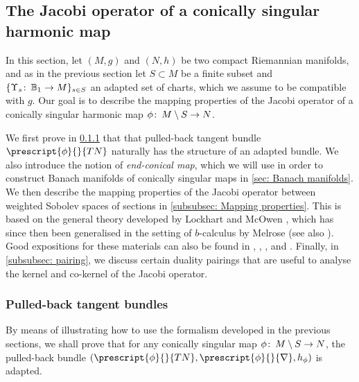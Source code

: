 \documentclass{article}
\numberwithin{equation}{section}        %
\theoremstyle{bfnote}
\theoremstyle{definition}
\theoremstyle{bfremark}
\newcommand{\col}{\colon \thinspace}        %
\newcommand{\Ball}{\mathbb{B}}              %
\begin{document}
        \subsection{The Jacobi operator of a conically singular harmonic map}       \label{subsec: The Jacobi operator of a CS harmonic map}

In this section, let $(M,g)$ and $(N,h)$ be two compact Riemannian manifolds, and as in the previous section let $S \subset M$ be a finite subset and $\{\Upsilon_s \col \Ball_1 \to M\}_{s \in S}$ an adapted set of charts, which we assume to be compatible with $g$. Our goal is to describe the mapping properties of the Jacobi operator of a conically singular harmonic map $\phi \col M \setminus S \to N$. 

We first prove in \cref{subsubsec: pulled-back tangent bundles} that that pulled-back tangent bundle $\prescript{\phi}{}{TN}$ naturally has the structure of an adapted bundle. We also introduce the notion of \emph{end-conical map}, which we will use in order to construct Banach manifolds of conically singular maps in \cref{sec: Banach manifolds}. We then describe the mapping properties of the Jacobi operator between weighted Sobolev spaces of sections in \cref{subsubsec: Mapping properties}. This is based on the general theory developed by Lockhart and McOwen \cite{Lockhart1985ellipticOperators_on_noncompact_mfds}, which has since then been generalised in the setting of $b$-calculus by Melrose \cite{Melrose1983bCalculus} (see also \cite{Melrose1993AtyiahPatodiSinger}). Good expositions for these materials can also be found in \cite{Bartnik1986mass_of_ALF}, \cite{Donaldson2002FloerHomology}, \cite{KarigiannisLotay2020conifolds}, and \cite{Pacard2008lecture_notes_connected_sums}. Finally, in \cref{subsubsec: pairing}, we discuss certain duality pairings that are useful to analyse the kernel and co-kernel of the Jacobi operator.


    \subsubsection{Pulled-back tangent bundles}     \label{subsubsec: pulled-back tangent bundles}

By means of illustrating how to use the formalism developed in the previous sections, we shall prove that for any conically singular map $\phi \col M \setminus S \to N$, the pulled-back bundle $(\prescript{\phi}{}{TN},\prescript{\phi}{}{\nabla},h_\phi)$ is adapted.
\end{document}
